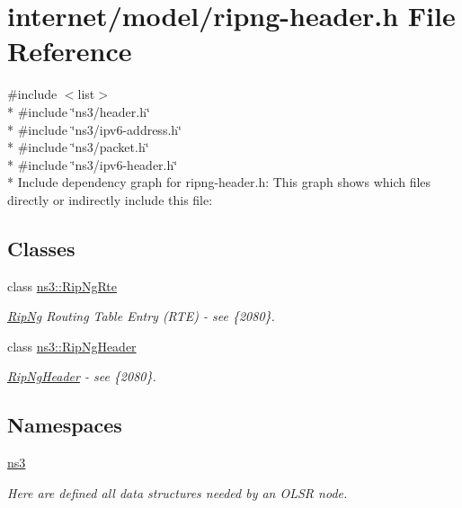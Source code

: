 \hypertarget{ripng-header_8h}{}\section{internet/model/ripng-\/header.h File Reference}
\label{ripng-header_8h}
{\ttfamily \#include $<$list$>$}\\*
{\ttfamily \#include \char`\"{}ns3/header.\+h\char`\"{}}\\*
{\ttfamily \#include \char`\"{}ns3/ipv6-\/address.\+h\char`\"{}}\\*
{\ttfamily \#include \char`\"{}ns3/packet.\+h\char`\"{}}\\*
{\ttfamily \#include \char`\"{}ns3/ipv6-\/header.\+h\char`\"{}}\\*
Include dependency graph for ripng-\/header.h\+:
This graph shows which files directly or indirectly include this file\+:
\subsection*{Classes}
\begin{DoxyCompactItemize}
\item 
class \hyperlink{classns3_1_1RipNgRte}{ns3\+::\+Rip\+Ng\+Rte}
\begin{DoxyCompactList}\small\item\em \hyperlink{classns3_1_1RipNg}{Rip\+Ng} Routing Table Entry (R\+TE) -\/ see \{2080\}. \end{DoxyCompactList}\item 
class \hyperlink{classns3_1_1RipNgHeader}{ns3\+::\+Rip\+Ng\+Header}
\begin{DoxyCompactList}\small\item\em \hyperlink{classns3_1_1RipNgHeader}{Rip\+Ng\+Header} -\/ see \{2080\}. \end{DoxyCompactList}\end{DoxyCompactItemize}
\subsection*{Namespaces}
\begin{DoxyCompactItemize}
\item 
 \hyperlink{namespacens3}{ns3}
\begin{DoxyCompactList}\small\item\em Here are defined all data structures needed by an O\+L\+SR node. \end{DoxyCompactList}\end{DoxyCompactItemize}
